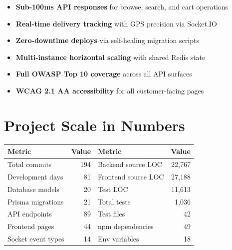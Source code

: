 \documentclass[11pt,a4paper,twoside]{book}
\begin{document}
\begin{tcolorbox}[insight,title=System Requirements]
\begin{itemize}[leftmargin=1.2em,nosep]
  \item \textbf{Sub-100ms API responses} for browse, search, and cart operations
  \item \textbf{Real-time delivery tracking} with GPS precision via Socket.IO
  \item \textbf{Zero-downtime deploys} via self-healing migration scripts
  \item \textbf{Multi-instance horizontal scaling} with shared Redis state
  \item \textbf{Full OWASP Top 10 coverage} across all API surfaces
  \item \textbf{WCAG 2.1 AA accessibility} for all customer-facing pages
\end{itemize}
\end{tcolorbox}

\section{Project Scale in Numbers}

\begin{center}\small
\begin{tabular}{lr lr}
\toprule
\textbf{Metric} & \textbf{Value} & \textbf{Metric} & \textbf{Value} \\
\midrule
Total commits        & 194          & Backend source LOC   & 22,767 \\
Development days     & 81           & Frontend source LOC  & 27,188 \\
Database models      & 20           & Test LOC             & 11,613 \\
Prisma migrations    & 21           & Total tests          & 1,036  \\
API endpoints        & 89           & Test files           & 42     \\
Frontend pages       & 44           & npm dependencies     & 49     \\
Socket event types   & 14           & Env variables        & 18     \\
\bottomrule
\end{tabular}
\end{center}

\end{document}
